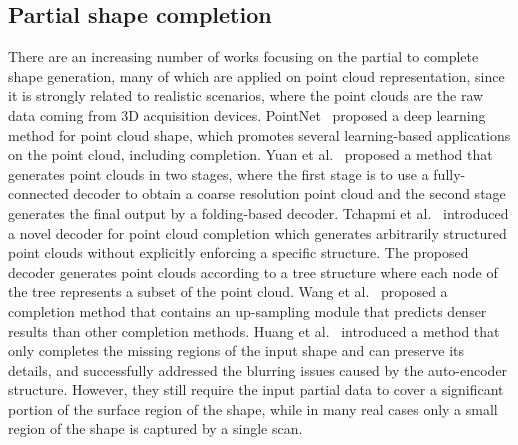 \subsection{Partial shape completion}
There are an increasing number of works focusing on the partial to complete shape generation, many of which are applied on point cloud representation, since it is strongly related to realistic scenarios, where the point clouds are the raw data coming from 3D acquisition devices. PointNet~\cite{qi2017pointnet} proposed a deep learning method for point cloud shape, which promotes several learning-based applications on the point cloud, including completion. Yuan et al.~ proposed a method that generates point clouds in two stages, where the first stage is to use a fully-connected decoder to obtain a coarse resolution point cloud and the second stage generates the final output by a folding-based decoder.
Tchapmi et al.~ introduced a novel decoder for point cloud completion which generates arbitrarily structured point clouds without explicitly enforcing a specific structure. The proposed decoder generates point clouds according to a tree structure where each node of the tree represents a subset of the point cloud.
Wang et al.~ proposed a completion method that contains an up-sampling module that predicts denser results than other completion methods.
Huang et al.~ introduced a method that only completes the missing regions of the input shape and can preserve its details, and successfully addressed the blurring issues caused by the auto-encoder structure. However, they still require the input partial data to cover a significant portion of the surface region of the shape, while in many real cases only a small region of the shape is captured by a single scan.

